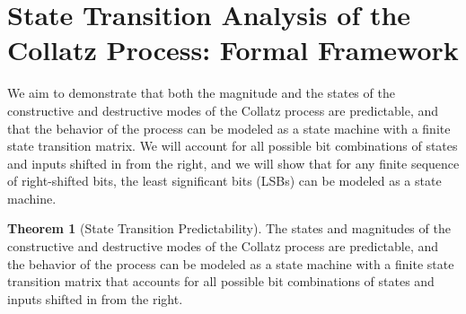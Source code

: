 \documentclass{article}
\theoremstyle{definition}
\newtheorem{theorem}{Theorem}
\begin{document}
\section{State Transition Analysis of the Collatz Process: Formal Framework}

We aim to demonstrate that both the magnitude and the states of the constructive and destructive modes of the Collatz process are predictable, and that the behavior of the process can be modeled as a state machine with a finite state transition matrix. We will account for all possible bit combinations of states and inputs shifted in from the right, and we will show that for any finite sequence of right-shifted bits, the least significant bits (LSBs) can be modeled as a state machine.

\begin{theorem}[State Transition Predictability]
The states and magnitudes of the constructive and destructive modes of the Collatz process are predictable, and the behavior of the process can be modeled as a state machine with a finite state transition matrix that accounts for all possible bit combinations of states and inputs shifted in from the right.
\end{theorem}
\end{document}
